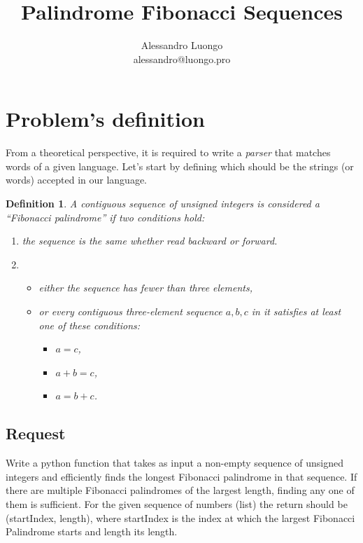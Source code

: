 \documentclass[12pt]{article}
\title{Palindrome Fibonacci Sequences}
\author{
        Alessandro Luongo \\
        alessandro@luongo.pro
}
\newtheorem{defn}{Definition}[section]
\begin{document}
\maketitle
\tableofcontents

\section{Problem's definition}
From a theoretical perspective, it is required to write a \emph{parser} that matches words of a given language. Let's start by defining which should be the strings (or words) accepted in our language.

\begin{defn}
\label{def1}
A contiguous sequence of unsigned integers is considered a ``Fibonacci palindrome'' if two conditions hold:
\begin{enumerate}
\item the sequence is the same whether read backward or forward.
\item \begin{itemize}
\item either the sequence has fewer than three elements,
\item or every contiguous three-element sequence ${a, b, c}$ in it satisfies at least one of these conditions:
\begin{itemize} 
\item $a=c$, 
\item $a+b=c$,
\item $a=b+c$.
\end{itemize}
\end{itemize}
\end{enumerate}
\end{defn}

\subsection{Request}
Write a python function that takes as input a non-empty sequence of unsigned integers and efficiently finds the longest Fibonacci palindrome in that sequence. If there are multiple Fibonacci palindromes of the largest length, finding any one of them is sufficient. For the given sequence of numbers (list) the return should be (startIndex, length), where startIndex is the index at which the largest Fibonacci Palindrome starts and length its length.
\end{document}
